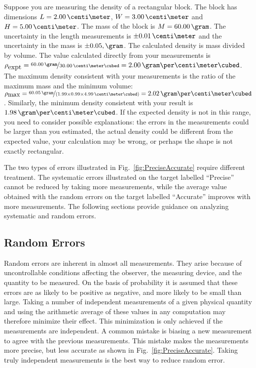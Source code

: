 Suppose you are measuring the density of a rectangular block. The block has dimensions $L=2.00\,\centi\meter$,  $ W=3.00\,\centi\meter$ and $H=5.00\,\centi\meter$. The mass of the block is $M=60.00\,\gram$. The uncertainty in the length measurements is $\pm0.01\,\centi\meter $ and the uncertainty in the mass is $\pm0.05,\gram$. The calculated density is mass divided by volume. The value calculated directly from your measurements is $\rho_{\mbox{expt}} = \nicefrac{60.00\,\gram}{30.00\,\centi\meter\cubed} = 2.00\,\gram\per\centi\meter\cubed $. The maximum density consistent with your measurements is the ratio of the maximum mass and the minimum volume: \(\rho_{\mbox{max}} = \nicefrac{60.05\,\gram}{\left(1.99\times0.99\times4.99\,\centi\meter\cubed\right)} = 2.02\,\gram\per\centi\meter\cubed\). Similarly, the minimum density consistent with your result is $1.98\,\gram\per\centi\meter\cubed$. If the expected density is not in this range, you need to consider possible explanations: the errors in the measurements could be larger than you estimated, the actual density could be different from the expected value, your calculation may be wrong, or perhaps the shape is not exactly rectangular.

The two types of errors illustrated in Fig.~\ref{fig:PreciseAccurate} require different treatment. The systematic errors illustrated on the target labelled ``Precise'' cannot be reduced by taking more measurements, while the average value obtained with the random errors on the target labelled ``Accurate'' improves with more measurements. The following sections provide guidance on analyzing systematic and random errors.

\subsection{Random Errors}
\label{sub:RandomErrors}

Random errors are inherent in almost all measurements. They arise because of uncontrollable conditions affecting the observer, the measuring device, and the quantity to be measured. On the basis of probability it is assumed that these errors are as likely to be positive as negative, and more likely to be small than large. Taking a number of independent measurements of a given physical quantity and using the arithmetic average of these values in any computation may therefore minimize their effect. This minimization is only achieved if the measurements are independent. A common mistake is biasing a new measurement to agree with the previous measurements. This mistake makes the measurements more precise, but less accurate as shown in Fig.~\ref{fig:PreciseAccurate}. Taking truly independent measurements is the best way to reduce random error.

